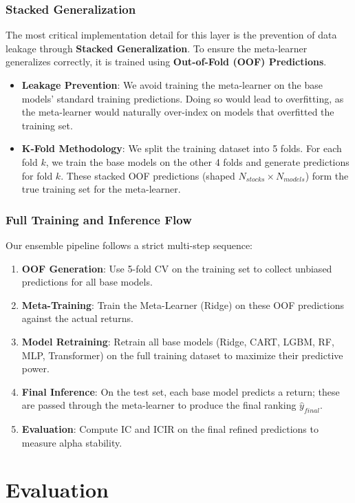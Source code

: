 \documentclass[11pt]{article}
\begin{document}
\subsubsection{Stacked Generalization}
The most critical implementation detail for this layer is the prevention of data leakage through \textbf{Stacked Generalization}. To ensure the meta-learner generalizes correctly, it is trained using \textbf{Out-of-Fold (OOF) Predictions}.

\begin{itemize}
    \item \textbf{Leakage Prevention}: We avoid training the meta-learner on the base models' standard training predictions. Doing so would lead to overfitting, as the meta-learner would naturally over-index on models that overfitted the training set.
    \item \textbf{K-Fold Methodology}: We split the training dataset into 5 folds. For each fold $k$, we train the base models on the other 4 folds and generate predictions for fold $k$. These stacked OOF predictions (shaped $N_{stocks} \times N_{models}$) form the true training set for the meta-learner.
\end{itemize}

\subsubsection{Full Training and Inference Flow}
Our ensemble pipeline follows a strict multi-step sequence:
\begin{enumerate}
    \item \textbf{OOF Generation}: Use 5-fold CV on the training set to collect unbiased predictions for all base models.
    \item \textbf{Meta-Training}: Train the Meta-Learner (Ridge) on these OOF predictions against the actual returns.
    \item \textbf{Model Retraining}: Retrain all base models (Ridge, CART, LGBM, RF, MLP, Transformer) on the full training dataset to maximize their predictive power.
    \item \textbf{Final Inference}: On the test set, each base model predicts a return; these are passed through the meta-learner to produce the final ranking $\hat{y}_{final}$.
    \item \textbf{Evaluation}: Compute IC and ICIR on the final refined predictions to measure alpha stability.
\end{enumerate}

\section{Evaluation}
\end{document}
